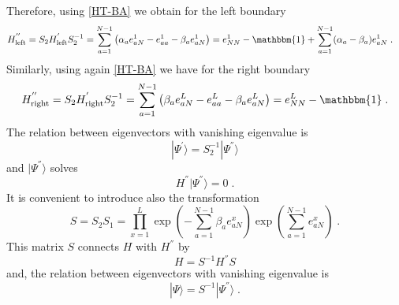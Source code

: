 \documentclass[10pt]{article}
\numberwithin{equation}{section}
\numberwithin{equation}{subsection}
\newcommand{\dt}{\;.}
\begin{document}
Therefore, using \eqref{HT-BA} we obtain for the left boundary 
\begin{equation}
	\begin{split}
		H_{\text{left}}^{''}&=S_{2}H_{\text{left}}^{'}S_{2}^{-1}
		=
		\sum_{a=1}^{N-1}\left(\alpha_{a}e_{aN}^{1}-e_{aa}^{1}-\beta_{a}e_{aN}^{1}\right)
		=
		e_{NN}^{1}-\mathbbm{1}+\sum_{a=1}^{N-1}(\alpha_{a}-\beta_{a})e_{aN}^{1}\dt
	\end{split}
\end{equation}
Similarly, using again \eqref{HT-BA} we have for the right boundary 
\begin{equation}
	\begin{split}
			H_{\text{right}}^{''}=S_{2}H_{\text{right}}^{'}S_{2}^{-1}
			=
			\sum_{a=1}^{N-1}\left(\beta_{a}e_{aN}^{L}-e_{aa}^{L}-\beta_{a}e_{aN}^{L}\right)=
			e_{NN}^{L}-\mathbbm{1}\dt
	\end{split}
\end{equation}
The relation between eigenvectors with vanishing eigenvalue is 
\begin{equation}\label{S2-Inverse}
	|\Psi^{'}\rangle = S_{2}^{-1}|\Psi^{''}\rangle
\end{equation}
and $|\Psi^{''}\rangle$ solves
\begin{equation}\label{steadyS-SECOND-def}
	H^{''}|\Psi^{''}\rangle=0\dt
\end{equation}
It is convenient to introduce also the transformation
\begin{equation}\label{similarity}
	S=S_{2}S_{1}=\prod_{x=1}^{L}\exp{\left(-\sum_{a=1}^{N-1}\beta_{a}e_{aN}^{x}\right)}\exp{\left(\sum_{a=1}^{N-1}e_{aN}^{x}\right)}\dt
\end{equation}
This matrix $S$ connects $H$ with $H^{''}$ by 
\begin{equation}
H=S^{-1}H^{''}S
\end{equation}
and, the relation between eigenvectors with vanishing eigenvalue is
\begin{equation}
	|\Psi\rangle=S^{-1}|\Psi^{''}\rangle\dt
\end{equation}
\end{document}
